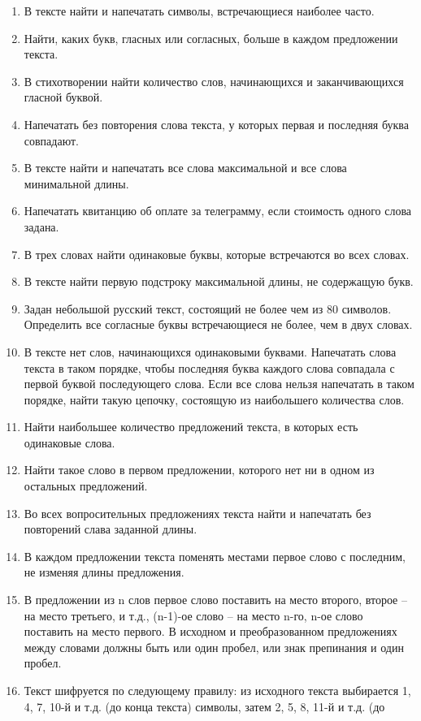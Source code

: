 \documentclass[12pt]{article}
\begin{document}
\begin{enumerate}
	\item В тексте найти и напечатать символы, встречающиеся наиболее часто.
	\item Найти, каких букв, гласных или согласных, больше в каждом предложении 
текста.
	\item В стихотворении найти количество слов, начинающихся и 
заканчивающихся гласной буквой.
	\item Напечатать без повторения слова текста, у которых первая и последняя 
буква совпадают.
	\item В тексте найти и напечатать все слова максимальной и все  слова 
минимальной длины.
	\item Напечатать квитанцию об оплате за телеграмму, если стоимость одного 
слова задана.
	\item В трех словах найти одинаковые буквы, которые встречаются во всех 
словах.
	\item В тексте найти первую подстроку максимальной длины, не содержащую 
букв.
	\item Задан небольшой русский текст, состоящий не более чем из 80 символов. 
Определить все согласные буквы встречающиеся не более, чем в двух словах.
	\item В тексте нет слов, начинающихся одинаковыми буквами. Напечатать слова 
текста в таком порядке, чтобы последняя буква каждого слова совпадала с первой 
буквой последующего слова. Если все слова нельзя напечатать в таком порядке, 
найти такую цепочку, состоящую из наибольшего количества слов.
	\item Найти наибольшее количество предложений текста, в которых есть 
одинаковые слова.
	\item Найти такое слово в первом предложении, которого нет ни в одном из 
остальных предложений.
	\item Во всех вопросительных предложениях текста найти и напечатать без 
повторений слава заданной длины.
	\item В каждом предложении текста поменять местами первое слово с последним, 
не изменяя длины предложения.
	\item В предложении из n слов первое слово поставить на место второго, 
второе – на место третьего, и т.д., (n-1)-ое слово – на место n-го, n-ое слово 
поставить на место первого. В исходном и преобразованном предложениях между 
словами должны быть или один пробел, или знак препинания и один пробел.
	\item Текст шифруется по следующему правилу: из исходного текста выбирается 
1, 4, 7, 10-й и т.д. (до конца текста) символы, затем 2, 5, 8, 11-й и т.д. (до 

\end{enumerate}
\end{document}
